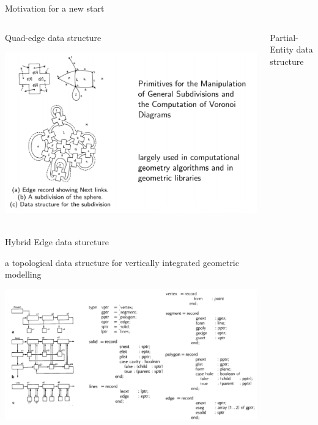 \begin{frame}{Motivation for a new start}
\protect\hypertarget{motivation-for-a-new-start}{}

\begin{columns}[T]
\begin{column}{0.48\textwidth}
\begin{block}{Quad-edge data structure \cite{Guibas1985}}

\includegraphics{figs/Guibas1985_quad_edge.png}~

\end{block}

\begin{block}{Hybrid Edge data sturcture \cite{Kalay1989}}

a topological data structure for vertically integrated geometric
modelling

\includegraphics{figs/Kalay1989_hybrid_edge.png}~

\end{block}
\end{column}

\begin{column}{0.48\textwidth}
\begin{block}{Partial-Entity data structure \cite{SangHunLee2001}}


\end{block}
\end{column}
\end{columns}
\end{frame}
